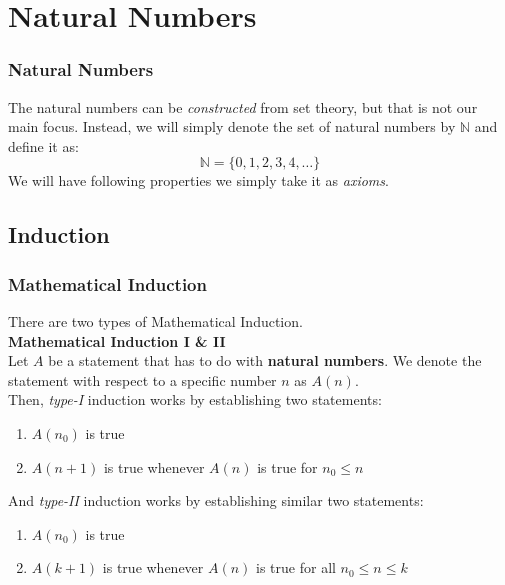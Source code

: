 \documentclass[12pt, t]{beamer}
\renewcommand{\emph}[1]{{\color{Turquoise3}\textsl{#1}}}
\begin{document}
\section{Natural Numbers}
\begin{frame}
    \frametitle{Natural Numbers}
The natural numbers can be \emph{constructed} from set theory, but that is not our main focus. 
Instead, we will simply denote the set of natural numbers by $\mathbb{N}$ and define it as:
\begin{equation*}
    \mathbb{N}=\{0,1,2,3,4,\dots\}
\end{equation*}
    We will have following properties we simply take it as \emph{axioms}.
    \begin{table}
        \centering
    \end{table}
\end{frame}

\subsection{Induction}
\begin{frame}
    \frametitle{Mathematical Induction}
    There are two types of Mathematical Induction.\\
\textbf{Mathematical Induction I \& II}\\
\hspace{1em} Let $A$ be a statement that has to do with \textbf{natural numbers}. We denote 
the statement with respect to a specific number $n$ as $A(n)$. \\
\vspace{1em}
Then, \emph{type-I} induction works by establishing two statements:
\begin{enumerate}
    \item $A(n_0)$ is true
    \item $A(n+1)$ is true whenever $A(n)$ is true for $n_0\leq n$
\end{enumerate}
\vspace{1em}
And \emph{type-II} induction works by establishing similar two statements:
\begin{enumerate}
    \item $A(n_0)$ is true
    \item $A(k+1)$ is true whenever $A(n)$ is true for all $n_0\leq n\leq k$
\end{enumerate}
\end{frame}
\end{document}
